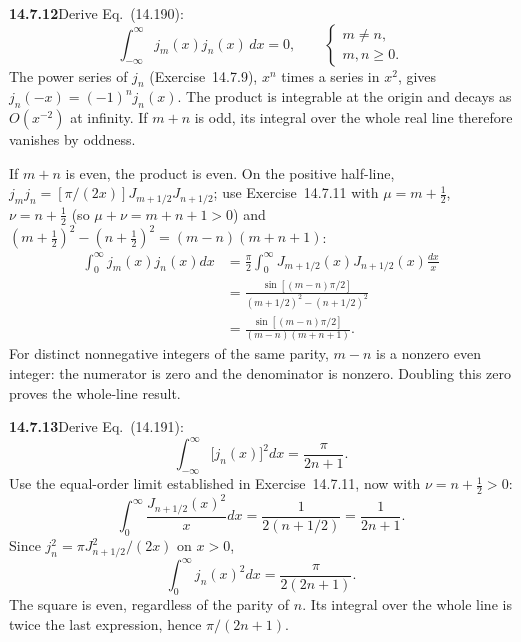 \par\bigskip
\noindent\textbf{14.7.12}\quad Derive Eq.~(14.190):
\[
\int_{-\infty}^{\infty}j_{m}(x)j_{n}(x)\,dx=0,\qquad
\begin{cases}m\neq n,\\m,n\ge0.\end{cases}
\]
\solution
The power series of $j_n$ (Exercise~14.7.9), $x^n$ times a series
in $x^2$, gives $j_n(-x)=(-1)^n j_n(x)$.
The product is integrable at the origin and decays as $O(x^{-2})$
at infinity. If $m+n$ is odd, its integral over the whole real
line therefore vanishes by oddness.

If $m+n$ is even, the product is even. On the positive half-line,
$j_mj_n=[\pi/(2x)]J_{m+1/2}J_{n+1/2}$; use Exercise~14.7.11 with
$\mu=m+\tfrac12$, $\nu=n+\tfrac12$ (so $\mu+\nu=m+n+1>0$) and
$(m+\frac12)^2-(n+\frac12)^2=(m-n)(m+n+1)$:
\begin{align*}
\int_0^\infty j_m(x)j_n(x)dx
&=\frac\pi2\int_0^\infty
J_{m+1/2}(x)J_{n+1/2}(x)\frac{dx}{x}\\
&=\frac{\sin[(m-n)\pi/2]}{(m+1/2)^2-(n+1/2)^2}\\
&=\frac{\sin[(m-n)\pi/2]}{(m-n)(m+n+1)}.
\end{align*}
For distinct nonnegative integers of the same parity, $m-n$ is a
nonzero even integer: the numerator is zero and the denominator
is nonzero. Doubling this zero proves the whole-line result.

\par\bigskip
\noindent\textbf{14.7.13}\quad Derive Eq.~(14.191):
\[
\int_{-\infty}^{\infty}\big[j_{n}(x)\big]^{2}dx=\frac{\pi}{2n+1}.
\]
\solution
Use the equal-order limit established in
Exercise~14.7.11, now with $\nu=n+\tfrac12>0$:
\[
\int_0^\infty\frac{J_{n+1/2}(x)^2}{x}dx
=\frac1{2(n+1/2)}=\frac1{2n+1}.
\]
Since $j_n^2=\pi J_{n+1/2}^2/(2x)$ on $x>0$,
\[
\int_0^\infty j_n(x)^2dx=\frac\pi{2(2n+1)}.
\]
The square is even, regardless of the parity of $n$. Its integral
over the whole line is twice the last expression, hence
$\boxed{\pi/(2n+1)}$.

